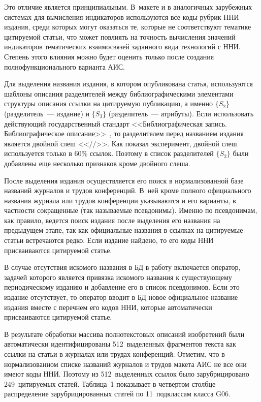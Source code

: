 \begin{multicols}{2}
     Это отличие является принципиальным. В~макете и в аналогичных зарубежных системах для вычисления
индикаторов используются все коды руб\-рик ННИ издания, среди которых могут оказаться те, которые не соответствуют
тематике цитируемой статьи, что может повлиять на точность вычисления значений индикаторов тематических
взаимосвязей заданного вида технологий с ННИ. Степень этого влияния можно будет оценить только после создания
полнофункционального варианта АИС.

     Для выделения названия издания, в котором опубликована статья, используются шаблоны описания разделителей
между библиографическими элементами структуры описания ссылки на цитируемую публикацию, а именно $\{S_2\}$
(разделитель~--- издание) и $\{S_3\}$ (разделитель~--- атрибуты). Если использовать действующий государственный
стандарт <<Библиографическая запись. Библиографическое описание>>~\cite{22-zat}, то разделителем перед названием
издания является двойной слеш <<//>>. Как показал эксперимент, двойной слеш используется только в 60\% ссылок.
Поэтому в список разделителей $\{S_2\}$ были добавлены еще несколько признаков кроме двойного слеша.

     После выделения издания осуществляется его поиск в нормализованной базе названий журналов и трудов
конференций. В~ней кроме полного официального названия журнала или трудов
конференции указываются и его
варианты, в частности сокращенные (так называемые псевдонимы). Именно по псевдонимам, как правило, ведется поиск
издания после выделения его названия на предыдущем этапе, так как официальные названия в ссылках на цитируемые
статьи встречаются редко. Если издание найдено, то его коды ННИ присваиваются цитируемой статье.

     В случае отсутствия искомого названия в БД в работу включается оператор, задачей которого является
привязка искомого названия к существующему периодическому изданию и до\-бав\-ле\-ние его в список псевдонимов. Если
это издание отсутствует, то оператор вводит в БД новое официальное название издания вместе с перечнем его
кодов ННИ, которые автоматически присваиваются цитируемой статье.

     В результате обработки массива полнотекстовых описаний изобретений были автоматически идентифицированы
512~выделенных фрагментов текста как ссылки на статьи в журналах или трудах конференций. Отметим, что в
нормализованном списке названий журналов и трудов макета АИС не все они имеют коды ННИ. Поэтому из
512~выделенных ссылок было зарубрицировано 249~цитируемых статей. Таблица~1 показывает в четвертом столбце
распределение зарубрицированных статей по 11~подклассам класса G06.




\end{multicols}
